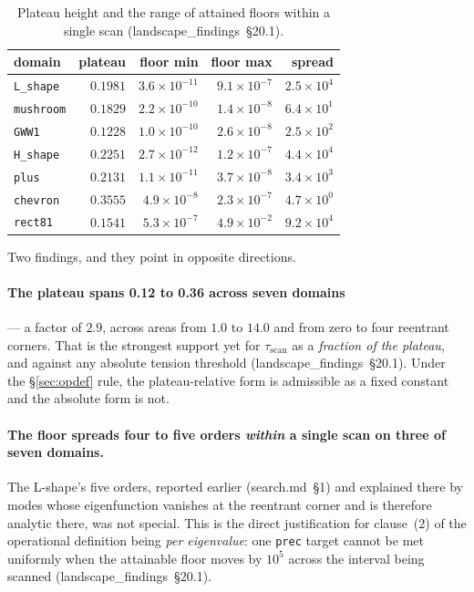 \documentclass[11pt]{article}
\newcommand{\file}[1]{\texttt{#1}}
\newcommand{\lf}[1]{(landscape\_findings~\S#1)}
\newcommand{\sm}[1]{(search.md~\S#1)}
\begin{document}
\begin{table}[htbp]
\centering
\caption{Plateau height and the range of attained floors within a single scan \lf{20.1}.}
\label{tab:plateau}
\begin{tabular}{lrrrr}
\toprule
domain & plateau & floor min & floor max & spread \\
\midrule
\file{L\_shape}  & $0.1981$ & $3.6\times10^{-11}$ & $9.1\times10^{-7}$ & $2.5\times10^{4}$ \\
\file{mushroom}  & $0.1829$ & $2.2\times10^{-10}$ & $1.4\times10^{-8}$ & $6.4\times10^{1}$ \\
\file{GWW1}      & $0.1228$ & $1.0\times10^{-10}$ & $2.6\times10^{-8}$ & $2.5\times10^{2}$ \\
\file{H\_shape}  & $0.2251$ & $2.7\times10^{-12}$ & $1.2\times10^{-7}$ & $4.4\times10^{4}$ \\
\file{plus}      & $0.2131$ & $1.1\times10^{-11}$ & $3.7\times10^{-8}$ & $3.4\times10^{3}$ \\
\file{chevron}   & $0.3555$ & $4.9\times10^{-8}$  & $2.3\times10^{-7}$ & $4.7\times10^{0}$ \\
\file{rect81}    & $0.1541$ & $5.3\times10^{-7}$  & $4.9\times10^{-2}$ & $9.2\times10^{4}$ \\
\bottomrule
\end{tabular}
\end{table}

Two findings, and they point in opposite directions.

\paragraph{The plateau spans 0.12 to 0.36 across seven domains} --- a factor of $2.9$, across
areas from $1.0$ to $14.0$ and from zero to four reentrant corners. That is the strongest
support yet for $\tau_{\mathrm{scan}}$ as a \emph{fraction of the plateau}, and against any
absolute tension threshold \lf{20.1}. Under the \S\ref{sec:opdef} rule, the plateau-relative
form is admissible as a fixed constant and the absolute form is not.

\paragraph{The floor spreads four to five orders \emph{within} a single scan on three of seven
domains.} The L-shape's five orders, reported earlier \sm{1} and explained there by modes whose
eigenfunction vanishes at the reentrant corner and is therefore analytic there, was not
special. This is the direct justification for clause~(2) of the operational definition being
\emph{per eigenvalue}: one \verb|prec| target cannot be met uniformly when the attainable floor
moves by $10^{5}$ across the interval being scanned \lf{20.1}.
\end{document}
